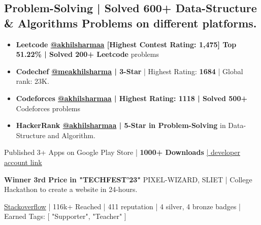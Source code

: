 \documentclass[a4,11pt]{article}
\newenvironment{zitemize}{
\begin{itemize}\itemsep0pt \parskip0pt \parsep1pt}
{\end{itemize}\vspace{-0.5cm}}
\begin{document}

\subsection{\large{Problem-Solving} \normalfont | Solved 600+ Data-Structure \& Algorithms Problems on different platforms.}

    \begin{zitemize}
        \item \textbf{Leetcode \href{https://leetcode.com/akhilsharmaa/}{@akhilsharmaa} [Highest Contest Rating: 1,475] Top 51.22\% | Solved 200+ Leetcode} problems

         \item \textbf{Codechef \href{https://www.codechef.com/users/meakhilsharma}{@meakhilsharma} |  \large{3-Star}} | Highest Rating: \textbf{1684} | Global rank: 23K.

         \item \textbf{Codeforces \href{https://codeforces.com/profile/akhilsharmaa}{@akhilsharmaa} | Highest Rating: 1118 |  Solved 500+} Codeforces problems

         \item \textbf{HackerRank \href{https://www.hackerrank.com/akhilsharmaa}{@akhilsharmaa} | 5-Star in Problem-Solving} in Data-Structure and Algorithm.

    \end{zitemize}
    \vspace{0.4cm}


     Published 3+ Apps on Google Play Store | \textbf{1000+ Downloads} \href{https://play.google.com/store/apps/dev?id=5576110735738802736}{| developer account link}
     \vspace{-0.02cm}

    \textbf{Winner 3rd Price in "TECHFEST'23"} PIXEL-WIZARD, SLIET | College Hackathon to create a website in 24-hours.


     \href{https://stackoverflow.com/users/15383052/akhilesh-sharma}{Stackoverflow}  | 116k+ Reached | 411 reputation | 4 silver, 4 bronze badges | Earned Tags: [ "Supporter", "Teacher" ]
     \vspace{-0.02cm}
\end{document}
